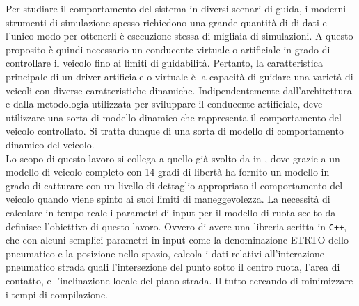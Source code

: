 Per studiare il comportamento del sistema in diversi scenari di guida, i moderni strumenti di simulazione spesso richiedono una grande quantità di di dati e l'unico modo per ottenerli è esecuzione stessa di migliaia di simulazioni. A questo proposito è quindi necessario un conducente virtuale o artificiale in grado di controllare il veicolo fino ai limiti di guidabilità. Pertanto, la caratteristica principale di un driver artificiale o virtuale è la capacità di guidare una varietà di veicoli con diverse caratteristiche dinamiche. Indipendentemente dall'architettura e dalla metodologia utilizzata per sviluppare il conducente artificiale, deve utilizzare una sorta di modello dinamico che rappresenta il comportamento del veicolo controllato. Si tratta dunque di una sorta di modello di comportamento dinamico del veicolo.\\
Lo scopo di questo lavoro si collega a quello già svolto da \citeauthor{Larcher} in \cite{Larcher}, dove grazie a un modello di veicolo completo con 14 gradi di libertà ha fornito un modello in grado di catturare con un livello di dettaglio appropriato il comportamento del veicolo quando viene spinto ai suoi limiti di maneggevolezza. La necessità di calcolare in tempo reale i parametri di input per il modello di ruota scelto da \cite{Larcher} definisce l'obiettivo di questo lavoro. Ovvero di avere una libreria scritta in \texttt{C++}, che con alcuni semplici parametri in input come la denominazione \ac{ETRTO} dello pneumatico e la posizione nello spazio, calcola i dati relativi all'interazione pneumatico strada quali l'intersezione del punto sotto il centro ruota, l'area di contatto, e l'inclinazione locale del piano strada. Il tutto cercando di minimizzare i tempi di compilazione.
%
\cite{Moller} \cite{RayTriangle} \cite{Swift} \cite{Schmeitz}